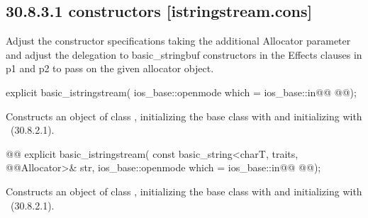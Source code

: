 \documentclass[ebook,11pt,article]{memoir}
\begin{document}
\subsection{30.8.3.1  constructors [istringstream.cons]}
Adjust the constructor specifications taking the additional Allocator parameter and adjust the delegation to basic_stringbuf constructors in the Effects clauses in p1 and p2 to pass on the given allocator object.

\begin{itemdecl}
explicit basic_istringstream(
  ios_base::openmode which = ios_base::in@\added{,}@
  @@);
\end{itemdecl}
\begin{itemdescr}
\pnum
\effects
Constructs an object of class
,
initializing the base class with
and initializing  with
~({30.8.2.1}).
\end{itemdescr}

\begin{itemdecl}
@@
explicit basic_istringstream(
  const basic_string<charT, traits, @@Allocator>& str,
  ios_base::openmode which = ios_base::in@\added{,}@
  @@);
\end{itemdecl}

\begin{itemdescr}
\pnum
\effects
Constructs an object of class
,
initializing the base class with
and initializing  with
~({30.8.2.1}).
\end{itemdescr}



\end{document}
